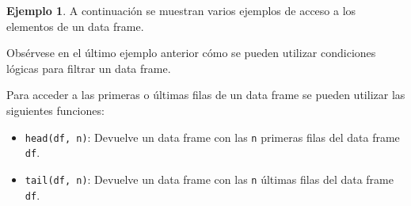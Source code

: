 \documentclass[
]{book}
\newenvironment{Shaded}{\begin{snugshade}}{\end{snugshade}}
\newcommand{\AttributeTok}[1]{\textcolor[rgb]{0.77,0.63,0.00}{#1}}
\newcommand{\CommentTok}[1]{\textcolor[rgb]{0.56,0.35,0.01}{\textit{#1}}}
\newcommand{\DecValTok}[1]{\textcolor[rgb]{0.00,0.00,0.81}{#1}}
\newcommand{\FloatTok}[1]{\textcolor[rgb]{0.00,0.00,0.81}{#1}}
\newcommand{\FunctionTok}[1]{\textcolor[rgb]{0.00,0.00,0.00}{#1}}
\newcommand{\NormalTok}[1]{#1}
\newcommand{\OtherTok}[1]{\textcolor[rgb]{0.56,0.35,0.01}{#1}}
\newcommand{\SpecialCharTok}[1]{\textcolor[rgb]{0.00,0.00,0.00}{#1}}
\newcommand{\StringTok}[1]{\textcolor[rgb]{0.31,0.60,0.02}{#1}}
\providecommand{\tightlist}{%
  \setlength{\itemsep}{0pt}\setlength{\parskip}{0pt}}
\theoremstyle{definition}
\theoremstyle{definition}
\newtheorem{example}{Ejemplo}[chapter]
\theoremstyle{definition}
\theoremstyle{definition}
\theoremstyle{remark}
\begin{document}
\begin{example}

A continuación se muestran varios ejemplos de acceso a los elementos de un data frame.

\begin{Shaded}
\end{Shaded}

\end{example}

Obsérvese en el último ejemplo anterior cómo se pueden utilizar condiciones lógicas para filtrar un data frame.

Para acceder a las primeras o últimas filas de un data frame se pueden utilizar las siguientes funciones:

\begin{itemize}
\tightlist
\item
  \texttt{head(df,\ n)}: Devuelve un data frame con las \texttt{n} primeras filas del data frame \texttt{df}.
\item
  \texttt{tail(df,\ n)}: Devuelve un data frame con las \texttt{n} últimas filas del data frame \texttt{df}.
\end{itemize}
\end{document}
